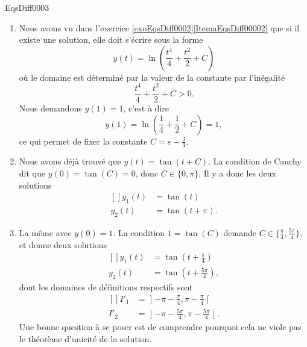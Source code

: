 
\begin{corrige}{EqsDiff0003}

\begin{enumerate}

\item
Nous avons vu dans l'exercice \ref{exoEqsDiff0002}\ref{ItemaEqsDiff00002} que si il existe une solution, elle doit s'écrire sous la forme
\begin{equation}
	y(t)=\ln\left( \frac{ t^4 }{ 4 }+\frac{ t^2 }{ 2 }+C \right)
\end{equation}
où le domaine est déterminé par la valeur de la constante par l'inégalité
\begin{equation}
	 \frac{ t^4 }{ 4 }+\frac{ t^2 }{ 2 }+C >0.
\end{equation}
Nous demandons $y(1)=1$, c'est à dire
\begin{equation}
	y(1)= \ln\left(\frac{ 1 }{ 4 }+\frac{ 1 }{ 2 }+C\right) =1,
\end{equation}
ce qui permet de fixer la constante $C=e-\frac{ 3 }{ 4 }$.

\item
Nous avons déjà trouvé que $y(t)=\tan(t+C)$. La condition de Cauchy dit que $y(0)=\tan(C)=0$, donc $C\in\{ 0,\pi \}$. Il y a donc les deux solutions
\begin{equation}
	\begin{aligned}[]
		y_1(t)&=\tan(t)\\
		y_2(t)&=\tan(t+\pi).
	\end{aligned}
\end{equation}

\item
La même avec $y(0)=1$. La condition $1=\tan(C)$ demande $C\in\{ \frac{ \pi }{ 4 },\frac{ 5\pi }{ 4 } \}$, et donne deux solutions
\begin{equation}
	\begin{aligned}[]
		y_1(t)&=\tan(t+\frac{ \pi }{ 4 })\\
		y_2(t)&=\tan(t+\frac{ 5\pi }{ 4 }),
	\end{aligned}
\end{equation}
dont les domaines de définitions respectifs sont
\begin{equation}
	\begin{aligned}[]
		I'_1&=\mathopen]-\pi-\frac{ \pi }{ 4 },\pi-\frac{ \pi }{ 4 }\mathclose[\\
		I'_2&=\mathopen]-\pi-\frac{ 5\pi }{ 4 },\pi-\frac{ 5\pi }{ 4 }\mathclose[.
	\end{aligned}
\end{equation}
Une bonne question à se poser est de comprendre pourquoi cela ne viole pas le théorème d'unicité de la solution.


\end{enumerate}
\end{corrige}
